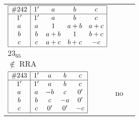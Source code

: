 \documentclass[12pt]{article}
\newcommand\RRA{\operatorname{RRA}}
\newcommand\notRRA{\ensuremath{\notin \RRA}}
\newcommand{\join}{\mathbin{+}}%
\newcommand{\id}{{1'}}%
\renewcommand{\div}{0'}
\renewcommand{\top}{1}%
\begin{document}
\begin{center}
\begin{longtable}{l|c|c}
$
\begin{array}{|c|cccc|} \hline
\#242 & \id & a & b & c \\ \hline
\id & \id & a & b & c \\
a & a & \top & a \join b & a \join c \\
b & b & a \join b & \top & b \join c \\
c & c & a \join c & b \join c & -c \\ \hline
\end{array}
$
 & \begin{tabular}{c} yes \\ $23_{65}$ \\ \notRRA \end{tabular} 
 & \adjustbox{valign=c, max height=1.6cm}{$
\left[ \begin{array}{cccccc}
\id & a & a & b & c & b \\ 
a & \id & a & a & a & a \\ 
a & a & \id & b & c & b \\ 
b & a & b & \id & b & b \\ 
c & a & c & b & \id & c \\ 
b & a & b & b & c & \id
\end{array}\right]
$}      \\[15mm]

$
\begin{array}{|c|cccc|} \hline
\#243 & \id & a & b & c \\ \hline
\id & \id & a & b & c \\
a & a & -b & c & \div \\
b & b & c & -a & \div \\
c & c & \div & \div & -c \\ \hline
\end{array}
$
 & no  
 & \adjustbox{valign=c, max height=1.6cm}{$
\left[ \begin{array}{cccccc}
\id & a & a & c & a & c \\ 
a & \id & a & a & c & c \\ 
a & a & \id & c & c & b \\ 
c & a & c & \id & b & b \\ 
a & c & c & b & \id & b \\ 
c & c & b & b & b & \id
\end{array}\right]
$}      \\[15mm]


\end{longtable}
\end{center}
\end{document}
